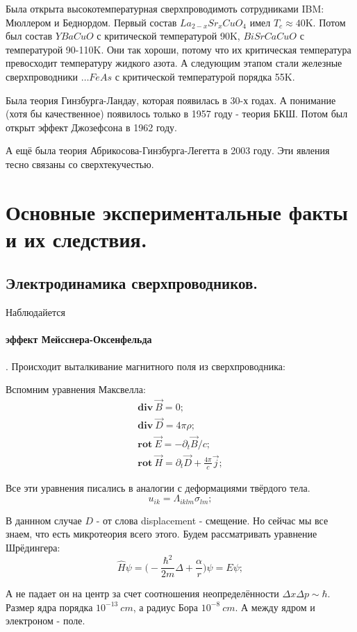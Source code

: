 \documentclass[a4paper, 14pt, russian]{article}
\newcommand{\be}{\begin{equation}}
\newcommand{\ee}{\end{equation}}
\newcommand{\bea}{\begin{eqnarray}}
\newcommand{\eea}{\end{eqnarray}}
\newcommand{\pa}{\partial}
\newcommand{\rot}{\textbf{rot}~}
\renewcommand{\div}{\textbf{div}~}
\begin{document}

	Была открыта высокотемпературная сверхпроводимоть сотрудниками IBM:
	Мюллером и Беднордом. Первый состав $La_{2-x} Sr_x Cu O_4$ имел
	$T_c \approx 40\text{K}$. Потом был состав $YBaCuO$ с критической 
	температурой 90K, $BiSrCaCuO$ с температурой 90-110K. Они так хороши,
	потому что их критическая температура превосходит температуру 
	жидкого азота. А следующим этапом стали железные сверхпроводники 
	$\hdots FeAs$ с критической температурой порядка 55K.

	Была теория Гинзбурга-Ландау, которая появилась в 30-х годах. 
	А понимание (хотя бы качественное) появилось только в 1957 году
	- теория БКШ. Потом был открыт эффект Джозефсона в 1962 году.

	А ещё была теория Абрикосова-Гинзбурга-Легетта в 2003 году. 
	Эти явления тесно связаны со сверхтекучестью. 

	\section{Основные экспериментальные факты и их следствия.}
	\subsection{Электродинамика сверхпроводников.}

	Наблюдайется \paragraph{эффект Мейсснера-Оксенфельда}.
	Происходит выталкивание магнитного поля из сверхпроводника:


	Вспомним уравнения Максвелла:
	\bea
		\div \vec B = 0;\\
		\div \vec D = 4 \pi \rho;\\
		\rot \vec E = - \pa_t \vec B / c;\\
		\rot \vec H = \pa_t \vec D + \frac{4\pi}{c} \vec j;
	\eea

	Все эти уравнения писались в аналогии с деформациями твёрдого тела.
	\be
		u_{ik} = \Lambda_{iklm} \sigma_{lm};
	\ee

	В даннном случае $D$ - от слова displacement - смещение. Но сейчас 
	мы все знаем, что есть микротеория всего этого. Будем рассматривать 
	уравнение Шрёдингера:
	\be
		\hat H \psi = \big(- \frac{\hbar^2}{2m} \Delta  + \frac{\alpha}{r}\big) \psi = E \psi;
	\ee

	А не падает он на центр за счет соотношения неопределённости $\Delta x \Delta p \sim \hbar$.
	Размер ядра порядка $10^{-13}~cm$, а радиус Бора $10^{-8}~cm$. А между ядром и электроном - поле.
	
\end{document}
